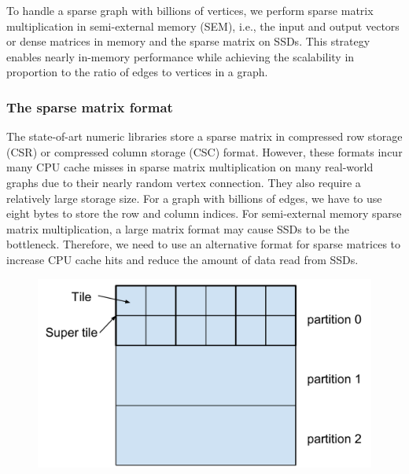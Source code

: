 To handle a sparse graph with billions of vertices, we perform sparse matrix
multiplication in semi-external memory (SEM),
i.e., the input and output vectors or dense matrices in memory and the sparse
matrix on SSDs. This strategy enables nearly in-memory performance while achieving
the scalability in proportion to the ratio of edges to vertices in a graph.

\subsubsection{The sparse matrix format}
The state-of-art numeric libraries store a sparse matrix in compressed row storage
(CSR) or compressed column storage (CSC) format. However, these formats incur
many CPU cache misses in sparse matrix multiplication on many real-world graphs
due to their nearly random vertex connection. They also require a relatively
large storage size. For a graph with billions of edges, we have to use eight
bytes to store the row and column indices. For semi-external memory sparse
matrix multiplication, a large matrix format may cause SSDs to be the bottleneck.
Therefore, we need to use an alternative format for sparse matrices to increase
CPU cache hits and reduce the amount of data read from SSDs.

\begin{figure}
\centering
\includegraphics[scale=0.3]{./sparse_mat.pdf}
\vspace{-5pt}
\caption{}
\vspace{-5pt}
\label{sparse_mat}
\end{figure}

